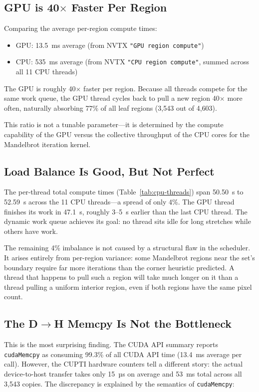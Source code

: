 \documentclass[
	english,
	letterpaper, oneside
]{article}
\begin{document}
\subsection{GPU is 40$\times$ Faster Per Region}

Comparing the average per-region compute times:

\begin{itemize}
    \item GPU: 13.5~ms average (from NVTX \texttt{"GPU region compute"})
    \item CPU: 535~ms average (from NVTX \texttt{"CPU region compute"}, summed across all 11 CPU threads)
\end{itemize}

The GPU is roughly 40$\times$ faster per region. Because all
threads compete for the same work queue, the GPU thread cycles back to
pull a new region 40$\times$ more often, naturally absorbing 77\% of all
leaf regions (3{,}543 out of 4{,}603).

This ratio is not a tunable parameter—it is determined by the compute
capability of the GPU versus the collective throughput of the CPU cores for
the Mandelbrot iteration kernel.

\subsection{Load Balance Is Good, But Not Perfect}

The per-thread total compute times (Table~\ref{tab:cpu-threads}) span
50.50~s to 52.59~s across the 11 CPU threads—a spread of only 4\%.
The GPU thread finishes its work in 47.1~s, roughly 3–5~s earlier than the
last CPU thread. The dynamic work queue achieves its goal: no thread sits
idle for long stretches while others have work.

The remaining 4\% imbalance is not caused by a structural flaw in the
scheduler. It arises entirely from per-region variance: some
Mandelbrot regions near the set's boundary require far more iterations than
the corner heuristic predicted. A thread that happens to pull such a region
will take much longer on it than a thread pulling a uniform interior region,
even if both regions have the same pixel count.

\subsection{The D$\rightarrow$H Memcpy Is Not the Bottleneck}

This is the most surprising finding. The CUDA API summary reports
\texttt{cudaMemcpy} as consuming 99.3\% of all CUDA API time (13.4~ms average
per call). However, the CUPTI hardware counters tell a different story: the
actual device-to-host transfer takes only 15~µs on average and
53~ms total across all 3{,}543 copies. The discrepancy is explained
by the semantics of \texttt{cudaMemcpy}:
\end{document}
